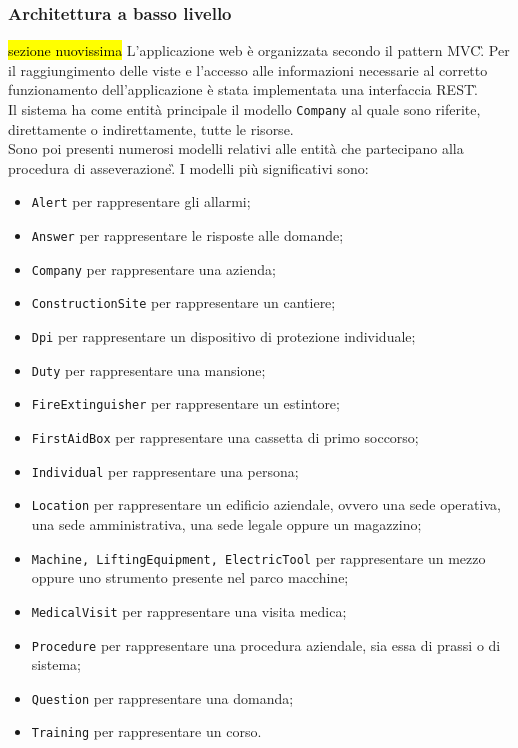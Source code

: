 \subsubsection{Architettura a basso livello}
\hl{sezione nuovissima}
L'applicazione web è organizzata secondo il pattern \gls{MVC}\G. Per il raggiungimento delle viste e l'accesso alle informazioni necessarie al corretto funzionamento dell'applicazione è stata implementata una interfaccia \gls{REST}\G. \\
Il sistema ha come entità principale il modello \texttt{Company} al quale sono riferite, direttamente o indirettamente, tutte le risorse.\\ 
Sono poi presenti numerosi modelli relativi alle entità che partecipano alla procedura di \gls{asseverazione}\G.
I modelli più significativi sono:
\begin{itemize} 
	\item \texttt{Alert} per rappresentare gli allarmi;
	\item \texttt{Answer} per rappresentare le risposte alle domande;
	\item \texttt{Company} per rappresentare una azienda;
	\item \texttt{ConstructionSite} per rappresentare un cantiere;
	\item \texttt{Dpi} per rappresentare un dispositivo di protezione individuale;
	\item \texttt{Duty} per rappresentare una mansione;
	\item \texttt{FireExtinguisher}  per rappresentare un estintore;
	\item \texttt{FirstAidBox} per rappresentare una cassetta di primo soccorso;
	\item \texttt{Individual} per rappresentare una persona;
	\item \texttt{Location} per rappresentare un edificio aziendale, ovvero una sede operativa, una sede amministrativa, una sede legale oppure un magazzino;
	\item \texttt{Machine, LiftingEquipment, ElectricTool}  per rappresentare un mezzo oppure uno strumento presente nel parco macchine;
	\item \texttt{MedicalVisit} per rappresentare una visita medica;
	\item \texttt{Procedure} per rappresentare una procedura aziendale, sia essa di prassi o di sistema;
	\item \texttt{Question} per rappresentare una domanda;
	\item \texttt{Training} per rappresentare un corso.
\end{itemize}	
